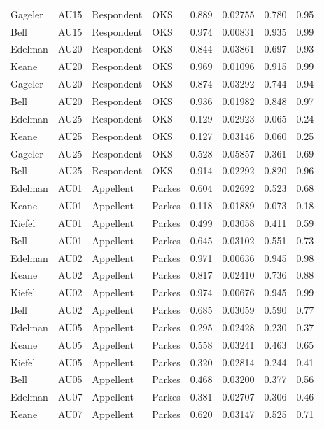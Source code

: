 \documentclass{monashthesis}
\begin{document}
\begin{center}
\begin{longtable}{llllllll}
Gageler & AU15 & Respondent & OKS & 0.889 & 0.02755 & 0.780 & 0.95 \\
Bell & AU15 & Respondent & OKS & 0.974 & 0.00831 & 0.935 & 0.99 \\
Edelman & AU20 & Respondent & OKS & 0.844 & 0.03861 & 0.697 & 0.93 \\
Keane & AU20 & Respondent & OKS & 0.969 & 0.01096 & 0.915 & 0.99 \\
Gageler & AU20 & Respondent & OKS & 0.874 & 0.03292 & 0.744 & 0.94 \\
Bell & AU20 & Respondent & OKS & 0.936 & 0.01982 & 0.848 & 0.97 \\
Edelman & AU25 & Respondent & OKS & 0.129 & 0.02923 & 0.065 & 0.24 \\
Keane & AU25 & Respondent & OKS & 0.127 & 0.03146 & 0.060 & 0.25 \\
Gageler & AU25 & Respondent & OKS & 0.528 & 0.05857 & 0.361 & 0.69 \\
Bell & AU25 & Respondent & OKS & 0.914 & 0.02292 & 0.820 & 0.96 \\
Edelman & AU01 & Appellent & Parkes & 0.604 & 0.02692 & 0.523 & 0.68 \\
Keane & AU01 & Appellent & Parkes & 0.118 & 0.01889 & 0.073 & 0.18 \\
Kiefel & AU01 & Appellent & Parkes & 0.499 & 0.03058 & 0.411 & 0.59 \\
Bell & AU01 & Appellent & Parkes & 0.645 & 0.03102 & 0.551 & 0.73 \\
Edelman & AU02 & Appellent & Parkes & 0.971 & 0.00636 & 0.945 & 0.98 \\
Keane & AU02 & Appellent & Parkes & 0.817 & 0.02410 & 0.736 & 0.88 \\
Kiefel & AU02 & Appellent & Parkes & 0.974 & 0.00676 & 0.945 & 0.99 \\
Bell & AU02 & Appellent & Parkes & 0.685 & 0.03059 & 0.590 & 0.77 \\
Edelman & AU05 & Appellent & Parkes & 0.295 & 0.02428 & 0.230 & 0.37 \\
Keane & AU05 & Appellent & Parkes & 0.558 & 0.03241 & 0.463 & 0.65 \\
Kiefel & AU05 & Appellent & Parkes & 0.320 & 0.02814 & 0.244 & 0.41 \\
Bell & AU05 & Appellent & Parkes & 0.468 & 0.03200 & 0.377 & 0.56 \\
Edelman & AU07 & Appellent & Parkes & 0.381 & 0.02707 & 0.306 & 0.46 \\
Keane & AU07 & Appellent & Parkes & 0.620 & 0.03147 & 0.525 & 0.71 \\

\end{longtable}
\end{center}
\end{document}

